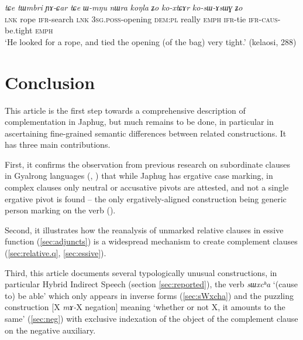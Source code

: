 \documentclass[oneside,a4paper,11pt]{article}
\newcommand{\ipa}[1]{\textit{\phon#1}}
\newcommand{\jpg}[2]{\ipa{#1} `#2'}
\begin{document}
\begin{exe}
\ex \label{ex:kosAsWG}
\gll 
\ipa{tɕe} 	\ipa{tɯmbri} 	\ipa{ɲɤ-ɕar} 	\ipa{tɕe} 	\ipa{ɯ-mŋu} 	\ipa{nɯra} 	\ipa{koŋla} 	\ipa{ʑo} 	\ipa{ko-xtɕɤr} 	\ipa{ko-sɯ-ɤsɯɣ} 	\ipa{ʑo} \\
\textsc{lnk} rope \textsc{ifr}-search \textsc{lnk} \textsc{3sg.poss}-opening \textsc{dem:pl} really \textsc{emph} \textsc{ifr}-tie \textsc{ifr-caus}-be.tight \textsc{emph} \\
\glt `He looked for a rope, and tied the opening (of the bag) very tight.' (kelaosi, 288)
\end{exe}
 
  
 \section*{Conclusion}
This article is the first step towards a comprehensive description of complementation in Japhug, but much remains to be done, in particular in ascertaining fine-grained semantic differences between related constructions. It has three main contributions.

First, it confirms the observation from previous research on subordinate clauses in Gyalrong languages (\citealt{jacques16relatives}, \citealt{jackson03caodeng}) that while Japhug has ergative case marking, in complex clauses only neutral or accusative pivots are attested, and not a single ergative pivot is found -- the only ergatively-aligned construction being  generic person marking on the verb (\citealt{jacques12demotion}).

Second, it illustrates how the reanalysis of unmarked relative clauses in essive function (\ref{sec:adjuncts}) is a widespread mechanism to create complement clauses (\ref{sec:relative.q}, \ref{sec:essive}).

Third, this article documents several typologically unusual constructions, in particular Hybrid Indirect Speech (section \ref{sec:reported}), the verb \jpg{sɯxcʰa}{(cause to) be able} which only appears in inverse forms (\ref{sec:sWxcha}) and the puzzling construction  [X \ipa{mɤ-}X negation] meaning `whether or not X, it amounts to the same' (\ref{sec:neg}) with exclusive indexation of the object of the complement clause on the negative auxiliary.



\end{document}
